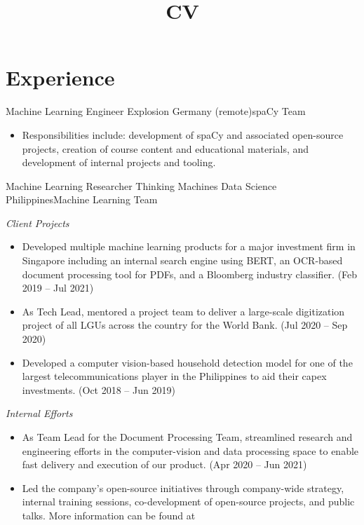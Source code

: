 \documentclass[12pt,a4paper]{moderncv}
\title{CV}
\begin{document}
\maketitle

\section{Experience}
{Machine Learning Engineer}
{Explosion}
{Germany (remote)}{spaCy Team}
{
    \begin{itemize}
        \item Responsibilities include: development of spaCy and associated open-source projects, creation of course content and educational materials, and development of internal projects and tooling. 
    \end{itemize}
}

{Machine Learning Researcher}
{Thinking Machines Data Science}
{Philippines}{Machine Learning Team}
{
    \vspace{3px}
    \textit{Client Projects}
    \begin{itemize}
        \item Developed multiple machine learning products for a major investment firm
            in Singapore including an internal search engine using BERT, 
            an OCR-based document processing tool for PDFs, and a Bloomberg industry
            classifier. (Feb 2019 -- Jul 2021)
        \item As Tech Lead, mentored a project team to deliver a large-scale
            digitization project of all LGUs across the country for the World Bank.
            (Jul 2020 -- Sep 2020)
        \item Developed a computer vision-based household detection model for
            one of the largest telecommunications player in the Philippines to
            aid their capex investments. (Oct 2018 -- Jun 2019)
    \end{itemize}
    \vspace{3px}
    \textit{Internal Efforts}
    \begin{itemize}
        \item As Team Lead for the Document Processing Team, streamlined
            research and engineering efforts in the computer-vision and data processing
            space to enable fast delivery and execution of our
            {\color{blue}}
            product. (Apr 2020 -- Jun 2021)
        \item Led the company's open-source initiatives through
            company-wide strategy, internal training sessions, co-development
            of open-source projects, and public talks. More information can be
            found at {\color{blue}
            }
    \end{itemize}
}
\end{document}
